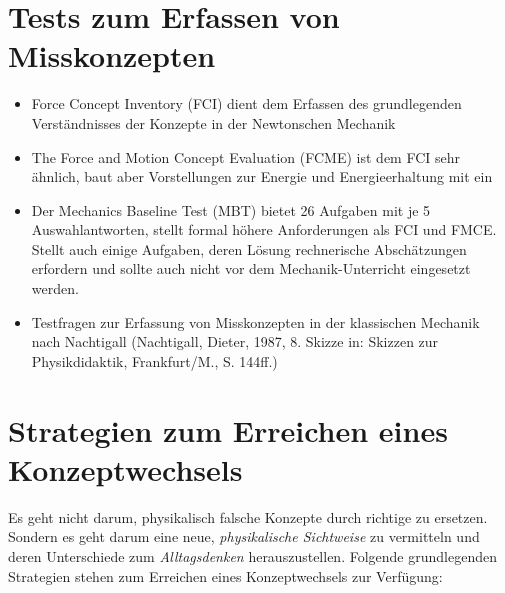 \bip\bip
\section{Tests zum Erfassen von Misskonzepten}

\begin{itemize}
\item Force Concept Inventory (FCI) dient dem Erfassen des grundlegenden Verst\"{a}ndnisses der Konzepte in der Newtonschen Mechanik
\item The Force and Motion Concept Evaluation (FCME) ist dem FCI sehr \"{a}hnlich, baut aber Vorstellungen zur Energie und Energieerhaltung mit ein
\item Der Mechanics Baseline Test (MBT) bietet 26 Aufgaben mit je 5 Auswahlantworten, stellt formal h\"{o}here Anforderungen als FCI und FMCE. Stellt auch einige Aufgaben, deren L\"{o}sung rechnerische Absch\"{a}tzungen erfordern und sollte auch nicht vor dem Mechanik-Unterricht eingesetzt werden.
\item Testfragen zur Erfassung von Misskonzepten in der klassischen Mechanik nach Nachtigall (Nachtigall, Dieter, 1987, 8. Skizze in: Skizzen zur Physikdidaktik, Frankfurt/M., S. 144ff.)
\end{itemize}

\bip\bip
\section{Strategien zum Erreichen eines Konzeptwechsels}
Es geht nicht darum, physikalisch falsche Konzepte durch richtige zu ersetzen. Sondern es geht darum eine neue, \emph{physikalische Sichtweise} zu vermitteln und deren Unterschiede zum \emph{Alltagsdenken} herauszustellen. Folgende grundlegenden Strategien stehen zum Erreichen eines Konzeptwechsels zur Verf{\"u}gung:

